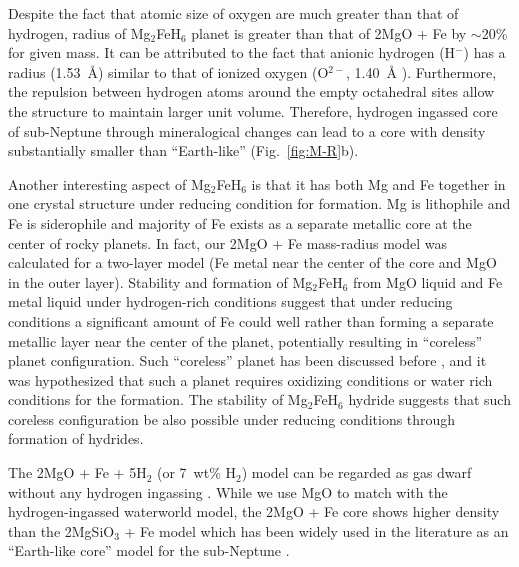 \documentclass[draft,jgrga,12pt]{agujournal2019}
\begin{document}
Despite the fact that atomic size of oxygen are much greater than that of hydrogen, radius of Mg$_2$FeH$_6$ planet is greater  than that of 2MgO + Fe by $\sim$20\% for given mass.  
It can be attributed to the fact that anionic hydrogen (H$^{-}$) has a radius (1.53~{\AA}) similar to that of ionized oxygen (O$^{2-}$, 1.40~{\AA} \cite{shannon_effective_1969}).
Furthermore, the repulsion between hydrogen atoms around the empty octahedral sites allow the structure to maintain larger unit volume.
Therefore, hydrogen ingassed core of sub-Neptune through mineralogical changes can lead to a core with density substantially smaller than ``Earth-like'' (Fig.~\ref{fig:M-R}b).

Another interesting aspect of Mg$_2$FeH$_6$ is that it has both Mg and Fe together in one crystal structure under reducing condition for formation.
Mg is lithophile and Fe is siderophile and majority of Fe exists as a separate metallic core at the center of rocky planets.
In fact, our 2MgO + Fe mass-radius model was calculated for a two-layer  model (Fe metal near the center of the core and MgO in the outer layer). 
Stability and formation of Mg$_2$FeH$_6$ from MgO liquid and Fe metal liquid under hydrogen-rich conditions \cite{kim_stability_2023} suggest that under reducing conditions a significant amount of Fe could well  rather than forming a separate metallic layer near the center of the planet, potentially resulting in ``coreless'' planet configuration.
Such ``coreless'' planet has been discussed before \cite{elkins-tanton_coreless_2008}, and it was hypothesized that such a planet requires oxidizing conditions or water rich conditions for the formation.  
The stability of Mg$_2$FeH$_6$ hydride suggests that such coreless configuration  be also possible under reducing conditions through formation of hydrides.

The 2MgO + Fe + 5H$_2$ (or 7~wt\% H$_2$) model can be regarded as gas dwarf without any hydrogen ingassing .
While we use MgO to match with the hydrogen-ingassed waterworld model, the 2MgO + Fe core shows higher density than the 2MgSiO$_3$ + Fe model which has been widely used in the literature as an ``Earth-like core'' model for the sub-Neptune \cite{valencia_internal_2006, sotin_mass_2007, zeng_detailed_2013}.
\end{document}
